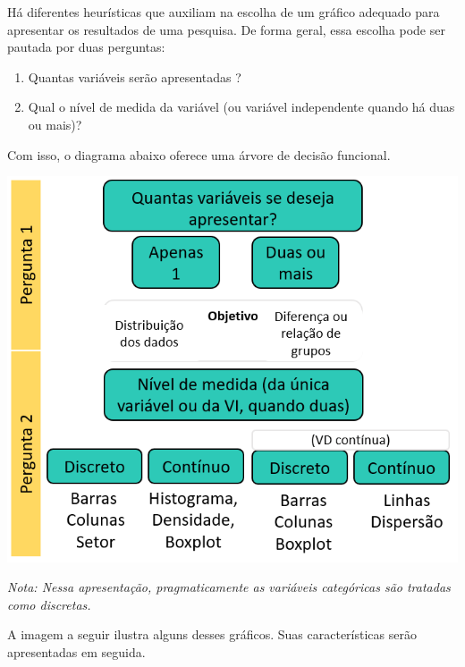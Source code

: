 \documentclass[
]{book}
\providecommand{\tightlist}{%
  \setlength{\itemsep}{0pt}\setlength{\parskip}{0pt}}
\begin{document}
Há diferentes heurísticas que auxiliam na escolha de um gráfico adequado para apresentar os resultados de uma pesquisa. De forma geral, essa escolha pode ser pautada por duas perguntas:

\begin{enumerate}
\def\labelenumi{\arabic{enumi}.}
\tightlist
\item
  Quantas variáveis serão apresentadas ?\\
\item
  Qual o nível de medida da variável (ou variável independente quando há duas ou mais)?
\end{enumerate}

Com isso, o diagrama abaixo oferece uma árvore de decisão funcional.

\includegraphics{./img/cap_como_fazer_graficos.png}

\emph{Nota: Nessa apresentação, pragmaticamente as variáveis categóricas são tratadas como discretas.}

A imagem a seguir ilustra alguns desses gráficos. Suas características serão apresentadas em seguida.
\end{document}
